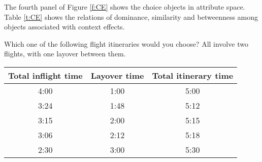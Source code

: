 
The fourth panel of Figure \ref{f:CE} shows the choice objects in attribute space.
Table \ref{t:CE} shows the relations of dominance, similarity and betweenness among objects associated with context effects.

\begin{tcolorbox}
Which one of the following flight itineraries would you choose?
All involve two flights, with one layover between them.

\begin{tabular}{ccc}
\hline
Total inflight time & Layover time & Total itinerary time \\ \hline
4:00 & 1:00 & 5:00 \\ 
3:24 & 1:48 & 5:12 \\ 
3:15 & 2:00 & 5:15 \\ 
3:06 & 2:12 & 5:18 \\ 
2:30 & 3:00 & 5:30 \\ \hline
\end{tabular}
\end{tcolorbox}
